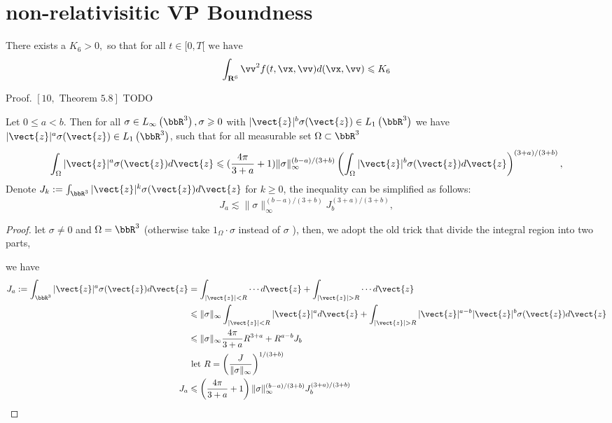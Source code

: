 \chapter{non-relativisitic VP Boundness}
\label{cha:boundness}


\begin{theorem}
    There exists a $K_{6}>0,$ so that for all $t \in[0, T[ \text { we have }$
\[
\int_{\mathbf{R}^{6}} \vv^{2} f(t, \vx, \vv) d(\vx, \vv) \leqslant K_{6}
\]
\end{theorem}

Proof. $[10, \text { Theorem } 5.8]$ TODO
\begin{lemma}
    Let $0 \leqslant a<b .$ Then for all $\sigma \in L_{\infty}\left(\bbR^{3}\right), \sigma \geqslant 0$ with $|\vect{z}|^{b} \sigma(\vect{z}) \in L_{1}\left(\bbR^{3}\right)$ we have $|\vect{z}|^{a} \sigma(\vect{z}) \in L_{1}\left(\bbR^{3}\right) $, such that for all measurable set $\Omega \subset \bbR^{3}$
\[
\int_{\Omega}|\vect{z}|^{a} \sigma(\vect{z}) d \vect{z} \leqslant (\frac{4\pi}{3+a}+1) \|\sigma\|_{\infty}^{(b-a) /(3+b)}\left(\int_{\Omega}|\vect{z}|^{b} \sigma(\vect{z}) d \vect{z}\right)^{(3+a) /(3+b)},
\]
Denote $
J_k:=\int_{\bbR^{3}}|\vect{z}|^{k} \sigma(\vect{z}) d \vect{z} 
$ for $k\geqslant 0$, the inequality can be simplified as follows:
\[
J_a \lesssim \|\sigma\|_{\infty}^{(b-a) /(3+b)} J_b^{(3+a) /(3+b)},
\]
\end{lemma}

\begin{proof}
   let $\sigma \neq 0$ and $\Omega=\bbR^{3}$ (otherwise take $1_{\Omega} \cdot \sigma$ instead of $\sigma$ ), then, we adopt the old trick that divide the integral region into two parts, 

we have
\[
\begin{aligned}
J_a:=\int_{\bbR^{3}}|\vect{z}|^{a} \sigma(\vect{z}) d \vect{z} &=\int_{|\vect{z}|<R} \cdots d \vect{z}+\int_{|\vect{z}|>R} \cdots d \vect{z} \\
& \leqslant\|\sigma\|_{\infty} \int_{|\vect{z}|<R}|\vect{z}|^{a} d \vect{z}+\int_{|\vect{z}|>R}|\vect{z}|^{a-b}|\vect{z}|^{b} \sigma(\vect{z}) d \vect{z} \\
& \leqslant \|\sigma\|_{\infty} \frac{4 \pi}{3+a} R^{3+a}+R^{a-b} J_b  \\
&\text{ let } R=\left(\frac{J}{\|\sigma\|_{\infty}}\right)^{1 /(3+b)}  \\
J_a & \leqslant\left(\frac{4 \pi}{3+a}+1\right)\|\sigma\|_{\infty}^{(b-a) /(3+b)} J_b^{(3+a) /(3+b)}
\end{aligned}
\]
\end{proof}


